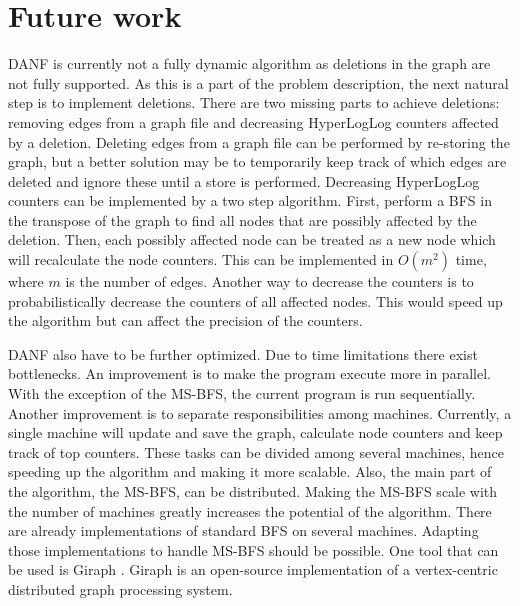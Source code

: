 \section{Future work}
\label{sec:future_work}
DANF is currently not a fully dynamic algorithm as deletions in the graph are not fully supported. As this is a part of the problem description, the next natural step is to implement deletions. There are two missing parts to achieve deletions: removing edges from a graph file and decreasing HyperLogLog counters affected by a deletion. Deleting edges from a graph file can be performed by re-storing the graph, but a better solution may be to temporarily keep track of which edges are deleted and ignore these until a store is performed. Decreasing HyperLogLog counters can be implemented by a two step algorithm. First, perform a BFS in the transpose of the graph to find all nodes that are possibly affected by the deletion. Then, each possibly affected node can be treated as a new node which will recalculate the node counters. This can be implemented in $O(m^2)$ time, where $m$ is the number of edges. Another way to decrease the counters is to probabilistically decrease the counters of all affected nodes. This would speed up the algorithm but can affect the precision of the counters.

DANF also have to be further optimized. Due to time limitations there exist bottlenecks. An improvement is to make the program execute more in parallel. With the exception of the MS-BFS, the current program is run sequentially. Another improvement is to separate responsibilities among machines. Currently, a single machine will update and save the graph, calculate node counters and keep track of top counters. These tasks can be divided among several machines, hence speeding up the algorithm and making it more scalable. Also, the main part of the algorithm, the MS-BFS, can be distributed. Making the MS-BFS scale with the number of machines greatly increases the potential of the algorithm. There are already implementations of standard BFS on several machines. Adapting those implementations to handle MS-BFS should be possible. One tool that can be used is Giraph \cite{giraph}. Giraph is an open-source implementation of a vertex-centric distributed graph processing system.